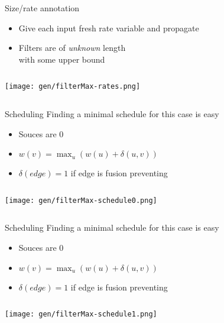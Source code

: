 \documentclass{beamer}
\begin{document}
\begin{frame}[fragile,b]{Size/rate annotation}
\begin{itemize}
\item Give each input fresh rate variable and propagate
\item Filters are of \emph{unknown} length \\ with some upper bound
\end{itemize}


\begin{columns}
\column[t]{5cm}

\column[t]{5cm}

\texttt{[image: gen/filterMax-rates.png]}

\end{columns}
\end{frame}


\begin{frame}[fragile,b]{Scheduling}
Finding a minimal schedule for this case is easy
\begin{itemize}
\item Souces are 0
\item $w(v) = \max_u (w(u) + \delta(u,v))$
\item $\delta(edge) = 1$ if edge is fusion preventing
\end{itemize}


\begin{columns}
\column[t]{5cm}

\column[t]{5cm}

\texttt{[image: gen/filterMax-schedule0.png]}

\end{columns}
\end{frame}

\begin{frame}[fragile,b]{Scheduling}
Finding a minimal schedule for this case is easy
\begin{itemize}
\item Souces are 0
\item $w(v) = \max_u (w(u) + \delta(u,v))$
\item $\delta(edge) = 1$ if edge is fusion preventing
\end{itemize}


\begin{columns}
\column[t]{5cm}

\column[t]{5cm}

\texttt{[image: gen/filterMax-schedule1.png]}

\end{columns}
\end{frame}
\end{document}
